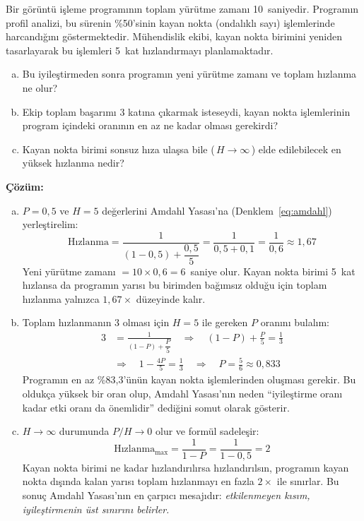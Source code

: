 \begin{ornek}[2.10]
Bir görüntü işleme programının toplam yürütme zamanı 10~saniyedir. Programın profil analizi, bu sürenin \%50'sinin kayan nokta (ondalıklı sayı) işlemlerinde harcandığını göstermektedir. Mühendislik ekibi, kayan nokta birimini yeniden tasarlayarak bu işlemleri 5~kat hızlandırmayı planlamaktadır.
\begin{enumerate}[(a)]
    \item Bu iyileştirmeden sonra programın yeni yürütme zamanı ve toplam hızlanma ne olur?
    \item Ekip toplam başarımı 3 katına çıkarmak isteseydi, kayan nokta işlemlerinin program içindeki oranının en az ne kadar olması gerekirdi?
    \item Kayan nokta birimi sonsuz hıza ulaşsa bile (\,$H \to \infty$\,) elde edilebilecek en yüksek hızlanma nedir?
\end{enumerate}

\textbf{Çözüm:}
\begin{enumerate}[(a)]
    \item $P = 0{,}5$ ve $H = 5$ değerlerini Amdahl Yasası'na (Denklem~\ref{eq:amdahl}) yerleştirelim:
    \[
    \text{Hızlanma} = \frac{1}{(1 - 0{,}5) + \dfrac{0{,}5}{5}} = \frac{1}{0{,}5 + 0{,}1} = \frac{1}{0{,}6} \approx 1{,}67
    \]
    Yeni yürütme zamanı $= 10 \times 0{,}6 = 6$~saniye olur. Kayan nokta birimi 5~kat hızlansa da programın yarısı bu birimden bağımsız olduğu için toplam hızlanma yalnızca $1{,}67\times$ düzeyinde kalır.

    \item Toplam hızlanmanın 3 olması için $H = 5$ ile gereken $P$ oranını bulalım:
    \begin{align*}
    3 &= \frac{1}{(1-P) + \dfrac{P}{5}}
    \quad \Longrightarrow \quad
    (1-P) + \frac{P}{5} = \frac{1}{3}\\[6pt]
    &\Longrightarrow \quad
    1 - \frac{4P}{5} = \frac{1}{3}
    \quad \Longrightarrow \quad
    P = \frac{5}{6} \approx 0{,}833
    \end{align*}
    Programın en az \%83,3'ünün kayan nokta işlemlerinden oluşması gerekir. Bu oldukça yüksek bir oran olup, Amdahl Yasası'nın neden ``iyileştirme oranı kadar etki oranı da önemlidir'' dediğini somut olarak gösterir.

    \item $H \to \infty$ durumunda $P/H \to 0$ olur ve formül sadeleşir:
    \[
    \text{Hızlanma}_{\max} = \frac{1}{1 - P} = \frac{1}{1 - 0{,}5} = 2
    \]
    Kayan nokta birimi ne kadar hızlandırılırsa hızlandırılsın, programın kayan nokta dışında kalan yarısı toplam hızlanmayı en fazla $2\times$ ile sınırlar. Bu sonuç Amdahl Yasası'nın en çarpıcı mesajıdır: \emph{etkilenmeyen kısım, iyileştirmenin üst sınırını belirler.}
\end{enumerate}
\end{ornek}

